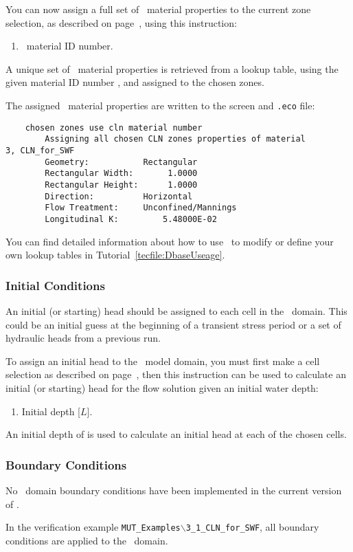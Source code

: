 You can now assign a full set of \cln\ material properties to the current zone selection, as described on page~\pageref{page:zoneSelect}, using this instruction:

    {
        \squish
        \begin{enumerate}
        \item {}  \cln\ material ID number.
        \end{enumerate}
          A unique set of \cln\ material properties is retrieved from a lookup table, using the given  material ID number , and assigned to the chosen zones.
    }

The assigned \cln\ material properties are written to the screen and \texttt{.eco} file:
\begin{verbatim}
    chosen zones use cln material number
    	Assigning all chosen CLN zones properties of material               3, CLN_for_SWF
    	Geometry:           Rectangular
    	Rectangular Width:       1.0000
    	Rectangular Height:      1.0000
    	Direction:          Horizontal
    	Flow Treatment:     Unconfined/Mannings
    	Longitudinal K:         5.48000E-02
\end{verbatim}

You can find detailed information about how to use \dbase\ to modify or define your own lookup tables in Tutorial~\ref{tecfile:DbaseUseage}.

\subsubsection{Initial Conditions}  
An initial (or starting) head should be assigned to each cell in the \cln\ domain.  This could be an initial guess at the beginning of a transient stress period or a set of hydraulic heads from a previous run.

To assign an initial head to the \cln\ model domain, you must first make a cell selection as described on page~\pageref{page:cellSelect}, then this instruction can be used to calculate an initial (or starting) head for the flow solution given an initial water depth:

    {
        \squish
        \begin{enumerate}
        \item {}  Initial depth [$L$].
        \end{enumerate}
          An initial depth of  is used to calculate an initial head at each of the chosen cells.
    }

\subsubsection{Boundary Conditions}  
No \cln\ domain boundary conditions have been implemented in the current version of \mut.

In the verification example \texttt{MUT\_Examples$\backslash$3\_1\_CLN\_for\_SWF}, all boundary conditions are applied to the \gwf\ domain.


